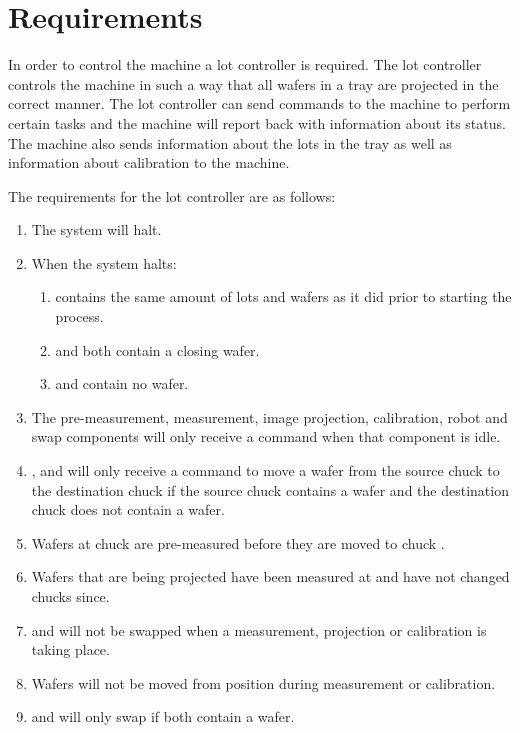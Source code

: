 \section{Requirements}
In order to control the machine a lot controller is required.
The lot controller controls the machine in such a way that all wafers in a tray are projected in the correct manner.
The lot controller can send commands to the machine to perform certain tasks and the machine will report back with information about its status.
The machine also sends information about the lots in the tray as well as information about calibration to the machine. 

The requirements for the lot controller are as follows:
\begin{enumerate}
    \item The system will halt.
    \item When the system halts:
        \begin{enumerate}
            \item \tray contains the same amount of lots and wafers as it did prior to starting the process.
            \item \chuckMeas and \chuckProj both contain a closing wafer.
            \item \chuckIn and \chuckOut contain no wafer.
        \end{enumerate}
    \item The pre-measurement, measurement, image projection, calibration, robot and swap components will only receive a command when that component is idle.
    \item \robotOne, \robotTwo and \robotThree will only receive a command to move a wafer from the source chuck to the destination chuck if the source chuck contains a wafer and the destination chuck does not contain a wafer.
    \item Wafers at chuck \chuckIn are pre-measured before they are moved to chuck \chuckMeas.
    \item Wafers that are being projected have been measured at \chuckMeas and have not changed chucks since.
    \item \chuckMeas and \chuckProj will not be swapped when a measurement, projection or calibration is taking place.
    \item Wafers will not be moved from \chuckMeas position during measurement or calibration.
    \item \chuckMeas and \chuckProj will only swap if both contain a wafer.

\end{enumerate}
